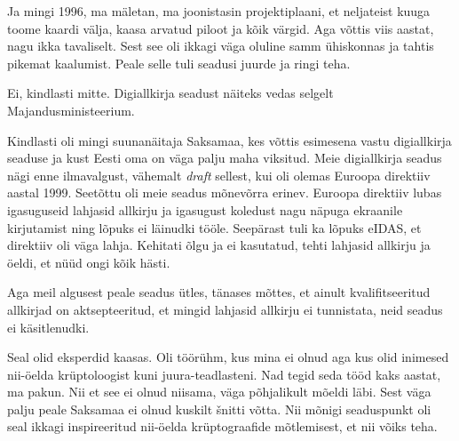 Ja mingi 1996, ma mäletan, ma joonistasin projektiplaani, et neljateist kuuga toome kaardi välja, kaasa arvatud piloot ja kõik värgid. Aga võttis viis aastat, nagu ikka tavaliselt. Sest see oli ikkagi väga oluline samm ühiskonnas ja tahtis pikemat kaalumist. Peale selle tuli seadusi juurde ja ringi teha. 


Ei, kindlasti mitte. Digiallkirja seadust näiteks vedas selgelt Majandusministeerium.


Kindlasti oli mingi suunanäitaja Saksamaa, kes võttis esimesena vastu digiallkirja seaduse ja kust Eesti oma on väga palju maha viksitud. Meie digiallkirja seadus nägi enne ilmavalgust, vähemalt \emph{draft} sellest, kui oli olemas Euroopa direktiiv aastal 1999. Seetõttu oli meie seadus mõnevõrra erinev. Euroopa direktiiv  lubas igasuguseid lahjasid allkirju ja igasugust koledust nagu  näpuga ekraanile kirjutamist ning lõpuks ei läinudki tööle. Seepärast  tuli ka lõpuks eIDAS, et direktiiv oli väga lahja. Kehitati õlgu ja ei kasutatud, tehti lahjasid allkirju ja öeldi, et nüüd ongi kõik hästi. 

Aga meil  algusest peale seadus ütles, tänases mõttes, et ainult kvalifitseeritud allkirjad on aktsepteeritud, et mingid lahjasid allkirju  ei tunnistata, neid seadus ei käsitlenudki. 


Seal olid eksperdid kaasas. Oli töörühm, kus mina ei olnud aga kus olid inimesed nii-öelda krüptoloogist kuni juura-teadlasteni. Nad tegid seda tööd kaks aastat, ma pakun. Nii et see ei olnud niisama, väga põhjalikult mõeldi läbi. Sest  väga palju peale Saksamaa ei olnud kuskilt šnitti võtta. Nii mõnigi seaduspunkt oli seal ikkagi inspireeritud nii-öelda krüptograafide mõtlemisest, et nii võiks teha. 

